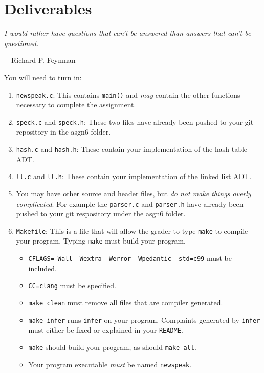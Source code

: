 \documentclass{article}
\begin{document}

\section{Deliverables}
\epigraph{\emph{I would rather have questions that can't be answered than
answers that can't be questioned.}}{---Richard P. Feynman}

You will need to turn in:

\begin{enumerate}
\item \texttt{newspeak.c}: This contains \texttt{main()} and \emph{may} contain
    the other functions necessary to complete the assignment.
\item \texttt{speck.c} and \texttt{speck.h}: These two files have already been pushed to your git repository in the asgn6 folder.
\item \texttt{hash.c} and \texttt{hash.h}: These contain your implementation of
    the hash table ADT.
\item \texttt{ll.c} and \texttt{ll.h}: These contain your implementation of the
    linked list ADT.
\item You may have other source and header files, but \emph{do not make things overly complicated}. For example the \texttt{parser.c} and
    \texttt{parser.h} have already been pushed to your git respository under the asgn6 folder.
\item \texttt{Makefile}: This is a file that will allow the grader to type
    \texttt{make} to compile your program. Typing \texttt{make} must build your
    program.
\begin{itemize}
    \item \texttt{CFLAGS=-Wall -Wextra -Werror -Wpedantic -std=c99} must be
        included.
    \item \texttt{CC=clang} must be specified.
    \item \texttt{make clean} must remove all files that are compiler generated.
    \item \texttt{make infer} runs \texttt{infer} on your program. Complaints
        generated by \texttt{infer} must either be fixed or explained in your
        \texttt{README}.
    \item \texttt{make} should build your program, as should \texttt{make all}.
    \item Your program executable \emph{must} be named \texttt{newspeak}.
\end{itemize}


\end{enumerate}
\end{document}
